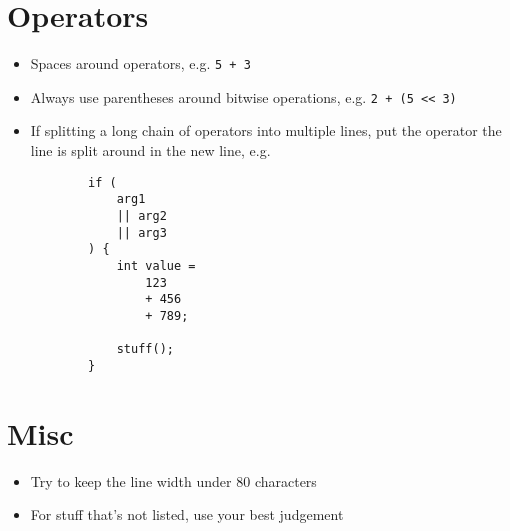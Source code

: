 \documentclass{article}
\begin{document}
\section{Operators}

\begin{itemize}
	\item Spaces around operators, e.g. \lstinline{5 + 3}
	\item Always use parentheses around bitwise operations, e.g. \lstinline{2 + (5 << 3)}
	\item If splitting a long chain of operators into multiple lines, put the operator the line is split around in the new line, e.g.
	\begin{lstlisting}
		if (
			arg1
			|| arg2
			|| arg3
		) {
			int value =
				123
				+ 456
				+ 789;

			stuff();
		}
	\end{lstlisting}
\end{itemize}

\section{Misc}

\begin{itemize}
	\item Try to keep the line width under 80 characters
	\item For stuff that's not listed, use your best judgement
\end{itemize}
\end{document}
